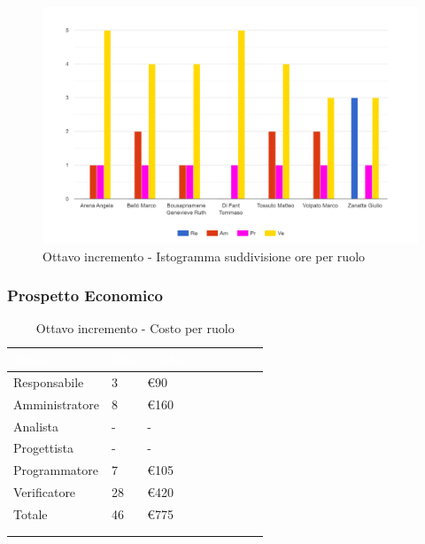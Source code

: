 {{      \begin{figure}[H]
        \includegraphics[width=15cm]{sezioni/Images/ottavo.png}
        \centering
        \caption{Ottavo incremento - Istogramma suddivisione ore per ruolo}
     \end{figure}
    }

    \subsubsection{Prospetto Economico}
    {
        \setlength{\freewidth}{\dimexpr\textwidth-30\tabcolsep}
        \renewcommand{\arraystretch}{1.0}
        \setlength{\aboverulesep}{0pt}
        \setlength{\belowrulesep}{0pt}
        \begin{longtable}{C{.4\freewidth} C{.2\freewidth} C{.2\freewidth} C{.2\freewidth} C{.2\freewidth} C{.2\freewidth} C{.2\freewidth} C{.2\freewidth} C{.2\freewidth}}
          \toprule
        \textcolor{white}{\textbf{Ruolo}}&
        \textcolor{white}{\textbf{Ore}}&
        \textcolor{white}{\textbf{Costo}}\\
        \toprule
        \endhead
            
        Responsabile  & 3 & €90\\
        Amministratore  & 8 & €160 \\
        Analista &- & -\\
        Progettista &- &-\\
        Programmatore &7 & €105\\
        Verificatore &28 &€420\\
        Totale&46&€775\\
        \bottomrule
      \\
        \caption{Ottavo incremento - Costo per ruolo}
        \end{longtable}

}}

